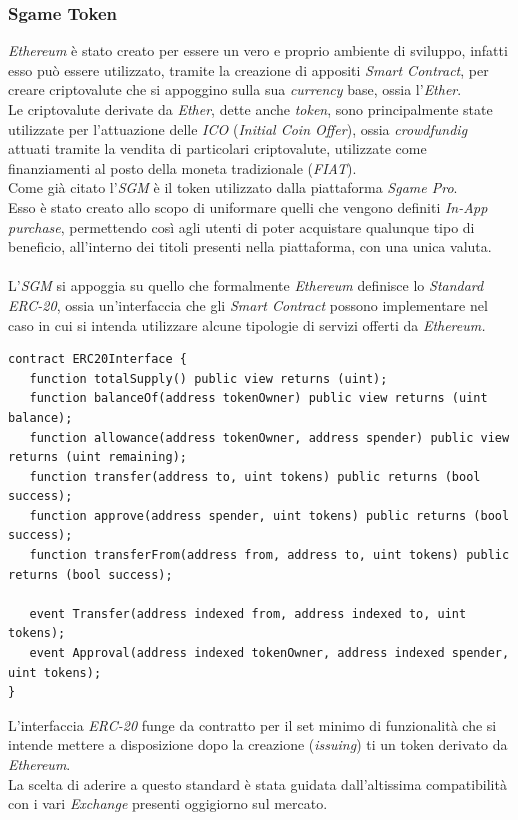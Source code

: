 \documentclass[11pt]{thesistemp}
\begin{document}
\subsubsection{Sgame Token}

\textit{Ethereum} è stato creato per essere un vero e proprio ambiente di sviluppo, infatti esso può essere utilizzato, tramite la creazione di appositi \textit{Smart Contract}, per creare criptovalute che si appoggino sulla sua \textit{currency} base, ossia l'\textit{Ether}.\\
Le criptovalute derivate da \textit{Ether}, dette anche \textit{token}, sono principalmente state utilizzate per l'attuazione delle \textit{ICO} (\textit{Initial Coin Offer}), ossia \textit{crowdfundig} attuati tramite la vendita di particolari criptovalute, utilizzate come finanziamenti al posto della moneta tradizionale (\textit{FIAT}).\\
Come già citato l'\textit{SGM} è il token utilizzato dalla piattaforma \textit{Sgame Pro}.\\
Esso è stato creato allo scopo di uniformare quelli che vengono definiti \textit{In-App purchase}, permettendo così agli utenti di poter acquistare qualunque tipo di beneficio, all'interno dei titoli presenti nella piattaforma, con una unica valuta.\\\\
L'\textit{SGM} si appoggia su quello che formalmente \textit{Ethereum} definisce lo \textit{Standard ERC-20}, ossia un'interfaccia che gli \textit{Smart Contract} possono implementare nel caso in cui si intenda utilizzare alcune tipologie di servizi offerti da \textit{Ethereum.}
\begin{lstlisting}[language=Solidity]
contract ERC20Interface {
   function totalSupply() public view returns (uint);
   function balanceOf(address tokenOwner) public view returns (uint balance);
   function allowance(address tokenOwner, address spender) public view returns (uint remaining);
   function transfer(address to, uint tokens) public returns (bool success);
   function approve(address spender, uint tokens) public returns (bool success);
   function transferFrom(address from, address to, uint tokens) public returns (bool success);

   event Transfer(address indexed from, address indexed to, uint tokens);
   event Approval(address indexed tokenOwner, address indexed spender, uint tokens);
}
\end{lstlisting}
L'interfaccia \textit{ERC-20} funge da contratto per il set minimo di funzionalità che si intende mettere a disposizione dopo la creazione (\textit{issuing}) ti un token derivato da \textit{Ethereum}.\\
La scelta di aderire a questo standard è stata guidata dall'altissima compatibilità con i vari \textit{Exchange} presenti oggigiorno sul mercato.
\end{document}
